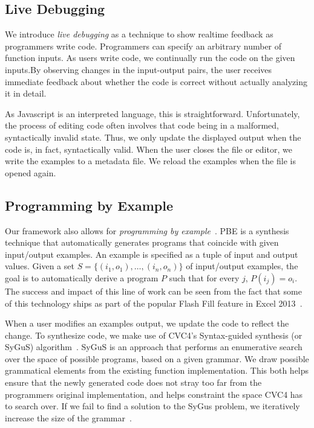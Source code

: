 \subsection{Live Debugging}
We introduce \textit{live debugging} as a technique to show realtime feedback as programmers write code.
Programmers can specify an arbitrary number of function inputs.
As users write code, we continually run the code on the given inputs.By observing changes in the input-output pairs,
the user receives immediate feedback about whether the code is correct without actually analyzing it in detail.

As Javascript is an interpreted language, this is straightforward.
Unfortunately, the process of editing code often involves that code
being in a malformed, syntactically invalid state.
Thus, we only update the displayed output when the code is, in fact,
syntactically valid.
When the user closes the file or editor,
we write the examples to a metadata file.
We reload the examples when the file is opened again.

\subsection{Programming by Example}
Our framework also allows for \textit{programming by example}~\cite{cypher93,lieberman01,synasc12}.
PBE  is a synthesis technique that automatically generates programs that coincide with given input/output examples. An example is specified as a tuple of input and output values. Given a set $S= \{(i_1, o_1),\ldots, (i_n, o_n)\}$ of input/output examples, the goal is to automatically derive a program $P$ such that for every $j$, $P(i_j) = o_i$. The success and impact of this line of work can be seen from the fact that some of this technology ships as part of the popular Flash Fill feature in Excel 2013~\cite{flashFillPOPL}.

When a user modifies an examples output, we update the code to reflect the change.
To synthesize code, we make use of CVC4's Syntax-guided synthesis (or SyGuS) algorithm~\cite{reynolds2017sygus}.
SyGuS is an approach that performs an enumerative search over the space of possible programs,
based on a given grammar.
We draw possible grammatical elements from the existing function implementation.
This both helps ensure that the newly generated code does not stray too far from the programmers original implementation,
and helps constraint the space CVC4 has to search over.
If we fail to find a solution to the SyGus problem, we iteratively increase the size of the grammar~.

